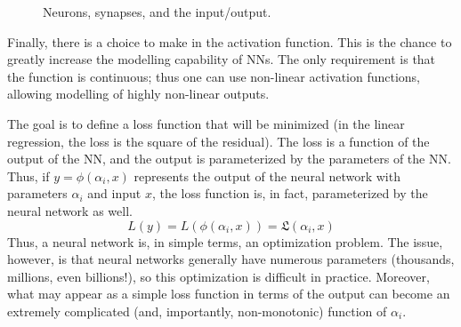 \begin{figure}[th]
	\centering
	\caption{Neurons, synapses, and the input/output.}
	\label{fig:neurons_synapse_io}
\end{figure}
Finally, there is a choice to make in the activation function. This is the chance to greatly increase the modelling capability of NNs. The only requirement is that the function is continuous; thus one can use non-linear activation functions, allowing modelling of highly non-linear outputs. 

The goal is to define a loss function that will be minimized (in the linear regression, the loss is the square of the residual). The loss is a function of the output of the NN, and the output is parameterized by the parameters of the NN. Thus, if $y=\phi(\alpha_i,x)$ represents the output of the neural network with parameters $\alpha_i$ and input $x$, the loss function is, in fact, parameterized by the neural network as well.
\begin{equation}
	L(y) = L(\phi(\alpha_i,x)) = \mathfrak{L}(\alpha_i,x)
\end{equation}
Thus, a neural network is, in simple terms, an optimization problem. The issue, however, is that neural networks generally have numerous parameters (thousands, millions, even billions!), so this optimization is difficult in practice. Moreover, what may appear as a simple loss function in terms of the output can become an extremely complicated (and, importantly, non-monotonic) function of $\alpha_i$.


